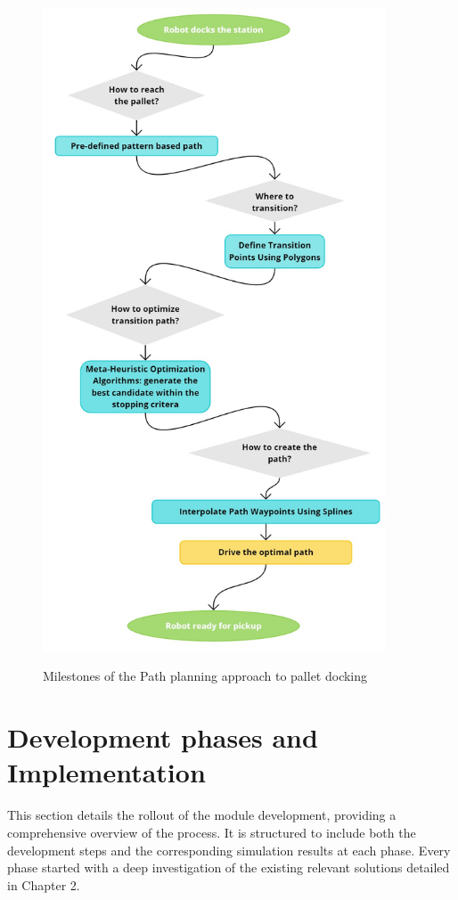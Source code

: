 \begin{figure}[H]
    \begin{center}
        \includegraphics[width=4in]{images/Chap2/Approch_design.jpg}\\
        \caption{Milestones of the Path planning approach to pallet docking}
        \label{design}
        \end{center}
\end{figure}

\section{Development phases and Implementation}

This section details the rollout of the module development, providing a comprehensive overview of the process. 
It is structured to include both the development steps and the corresponding simulation results at each phase.
Every phase started with a deep investigation of the existing relevant solutions detailed in Chapter 2.

